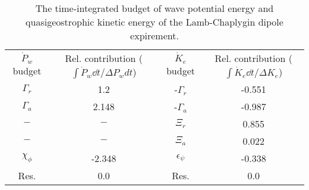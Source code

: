 \begin{table}
\begin{center}
\caption{The time-integrated budget of wave potential energy and quasigeostrophic                kinetic energy of the Lamb-Chaplygin dipole expirement. \label{table1}}
\begin{tabular}{cccc}
$\dot{P}_w$ budget & Rel. contribution ($\int\dot{P}_w \dd t/\Delta P_w dt$) & $\dot{K}_e$ budget & Rel. contribution ($\int\dot{K}_e \dd t/\Delta K_e$) \\
$\Gamma_r$ & 1.2 & -$\Gamma_r$ & -0.551 \\
$\Gamma_a$ & 2.148 & -$\Gamma_a$ & -0.987 \\
$-$ & $-$ & $\Xi_r$ & 0.855 \\
$-$ & $-$ & $\Xi_a$ & 0.022 \\
$\chi_\phi$ & -2.348 & $\epsilon_\psi$ & -0.338 \\
Res. & 0.0 & Res. & 0.0 \\
\end{tabular}
\end{center}
\end{table}
